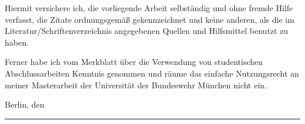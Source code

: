 Hiermit versichere ich, die vorliegende Arbeit selbständig und ohne fremde Hilfe verfasst, die Zitate ordnungsgemäß gekennzeichnet und keine anderen, als die im Literatur/Schriftenverzeichnis angegebenen Quellen und Hilfsmittel benutzt zu haben. 

Ferner habe ich vom Merkblatt über die Verwendung von studentischen Abschlussarbeiten Kenntnis genommen und räume das einfache Nutzungsrecht an meiner Masterarbeit der Universität der Bundeswehr München nicht ein.


\addvspace{15mm}

\noindent Berlin, den \VARabgabedatum \hfill \rule{80mm}{0.4pt}

\hfill \VARname





